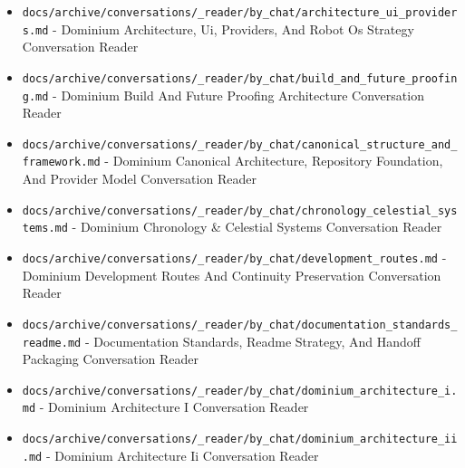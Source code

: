 \documentclass[10.5pt,a4paper,openany]{book}
\begin{document}
\begin{itemize}
\item \texttt{docs/\allowbreak{}archive/\allowbreak{}conversations/\allowbreak{}\_\allowbreak{}reader/\allowbreak{}by\_\allowbreak{}chat/\allowbreak{}architecture\_\allowbreak{}ui\_\allowbreak{}providers.\allowbreak{}md} -\allowbreak{} Dominium Architecture, Ui, Providers, And Robot Os Strategy Conversation Reader
\item \texttt{docs/\allowbreak{}archive/\allowbreak{}conversations/\allowbreak{}\_\allowbreak{}reader/\allowbreak{}by\_\allowbreak{}chat/\allowbreak{}build\_\allowbreak{}and\_\allowbreak{}future\_\allowbreak{}proofing.\allowbreak{}md} -\allowbreak{} Dominium Build And Future Proofing Architecture Conversation Reader
\item \texttt{docs/\allowbreak{}archive/\allowbreak{}conversations/\allowbreak{}\_\allowbreak{}reader/\allowbreak{}by\_\allowbreak{}chat/\allowbreak{}canonical\_\allowbreak{}structure\_\allowbreak{}and\_\allowbreak{}framework.\allowbreak{}md} -\allowbreak{} Dominium Canonical Architecture, Repository Foundation, And Provider Model Conversation Reader
\item \texttt{docs/\allowbreak{}archive/\allowbreak{}conversations/\allowbreak{}\_\allowbreak{}reader/\allowbreak{}by\_\allowbreak{}chat/\allowbreak{}chronology\_\allowbreak{}celestial\_\allowbreak{}systems.\allowbreak{}md} -\allowbreak{} Dominium Chronology \& Celestial Systems Conversation Reader
\item \texttt{docs/\allowbreak{}archive/\allowbreak{}conversations/\allowbreak{}\_\allowbreak{}reader/\allowbreak{}by\_\allowbreak{}chat/\allowbreak{}development\_\allowbreak{}routes.\allowbreak{}md} -\allowbreak{} Dominium Development Routes And Continuity Preservation Conversation Reader
\item \texttt{docs/\allowbreak{}archive/\allowbreak{}conversations/\allowbreak{}\_\allowbreak{}reader/\allowbreak{}by\_\allowbreak{}chat/\allowbreak{}documentation\_\allowbreak{}standards\_\allowbreak{}readme.\allowbreak{}md} -\allowbreak{} Documentation Standards, Readme Strategy, And Handoff Packaging Conversation Reader
\item \texttt{docs/\allowbreak{}archive/\allowbreak{}conversations/\allowbreak{}\_\allowbreak{}reader/\allowbreak{}by\_\allowbreak{}chat/\allowbreak{}dominium\_\allowbreak{}architecture\_\allowbreak{}i.\allowbreak{}md} -\allowbreak{} Dominium Architecture I Conversation Reader
\item \texttt{docs/\allowbreak{}archive/\allowbreak{}conversations/\allowbreak{}\_\allowbreak{}reader/\allowbreak{}by\_\allowbreak{}chat/\allowbreak{}dominium\_\allowbreak{}architecture\_\allowbreak{}ii.\allowbreak{}md} -\allowbreak{} Dominium Architecture Ii Conversation Reader

\end{itemize}
\end{document}
